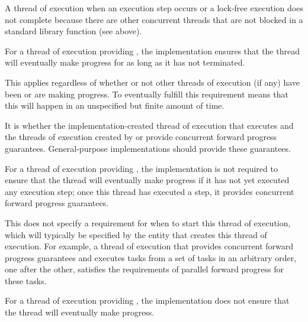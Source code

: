 \pnum
A thread of execution 
when an execution step occurs or a
lock-free execution does not complete because there are other concurrent threads
that are not blocked in a standard library function (see above).

\pnum
{}%
For a thread of execution providing ,
the implementation ensures that the thread will eventually make progress for as
long as it has not terminated.
\begin{note}
This applies regardless of whether or not other threads of execution (if any)
have been or are making progress. To eventually fulfill this requirement means that
this will happen in an unspecified but finite amount of time.
\end{note}

\pnum
It is  whether the
implementation-created thread of execution that executes
 and the threads of execution created by
or 
provide concurrent forward progress guarantees.
General-purpose implementations should provide these guarantees.

\pnum
{}%
For a thread of execution providing ,
the implementation is not required to ensure that the thread will eventually make
progress if it has not yet executed any execution step; once this thread has
executed a step, it provides concurrent forward progress guarantees.

\pnum
\begin{note}
This does not specify a requirement for when to start this thread of execution,
which will typically be specified by the entity that creates this thread of
execution. For example, a thread of execution that provides concurrent forward
progress guarantees and executes tasks from a set of tasks in an arbitrary order,
one after the other, satisfies the requirements of parallel forward progress for
these tasks.
\end{note}

\pnum
{}%
For a thread of execution providing , the implementation does not ensure that the thread will eventually
make progress.

